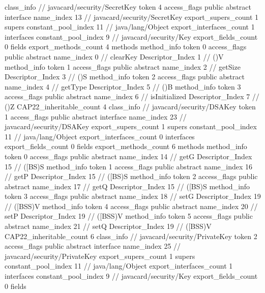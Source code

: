 {{{		}
		class_info {		// javacard/security/SecretKey
			token	4
			access_flags	public abstract interface
			name_index	13		// javacard/security/SecretKey
			export_supers_count	1
			supers {
				constant_pool_index	11		// java/lang/Object
			}
			export_interfaces_count	1
			interfaces {
				constant_pool_index	9		// javacard/security/Key
			}
			export_fields_count	0
			fields {
			}
			export_methods_count	4
			methods {
				method_info {
					token	0
					access_flags	public abstract
					name_index	0		// clearKey
					Descriptor_Index	1		// ()V
				}
				method_info {
					token	1
					access_flags	public abstract
					name_index	2		// getSize
					Descriptor_Index	3		// ()S
				}
				method_info {
					token	2
					access_flags	public abstract
					name_index	4		// getType
					Descriptor_Index	5		// ()B
				}
				method_info {
					token	3
					access_flags	public abstract
					name_index	6		// isInitialized
					Descriptor_Index	7		// ()Z
				}
			}
			CAP22_inheritable_count	4
		}
		class_info {		// javacard/security/DSAKey
			token	1
			access_flags	public abstract interface
			name_index	23		// javacard/security/DSAKey
			export_supers_count	1
			supers {
				constant_pool_index	11		// java/lang/Object
			}
			export_interfaces_count	0
			interfaces {
			}
			export_fields_count	0
			fields {
			}
			export_methods_count	6
			methods {
				method_info {
					token	0
					access_flags	public abstract
					name_index	14		// getG
					Descriptor_Index	15		// ([BS)S
				}
				method_info {
					token	1
					access_flags	public abstract
					name_index	16		// getP
					Descriptor_Index	15		// ([BS)S
				}
				method_info {
					token	2
					access_flags	public abstract
					name_index	17		// getQ
					Descriptor_Index	15		// ([BS)S
				}
				method_info {
					token	3
					access_flags	public abstract
					name_index	18		// setG
					Descriptor_Index	19		// ([BSS)V
				}
				method_info {
					token	4
					access_flags	public abstract
					name_index	20		// setP
					Descriptor_Index	19		// ([BSS)V
				}
				method_info {
					token	5
					access_flags	public abstract
					name_index	21		// setQ
					Descriptor_Index	19		// ([BSS)V
				}
			}
			CAP22_inheritable_count	6
		}
		class_info {		// javacard/security/PrivateKey
			token	2
			access_flags	public abstract interface
			name_index	25		// javacard/security/PrivateKey
			export_supers_count	1
			supers {
				constant_pool_index	11		// java/lang/Object
			}
			export_interfaces_count	1
			interfaces {
				constant_pool_index	9		// javacard/security/Key
			}
			export_fields_count	0
			fields {
			}
}}}
